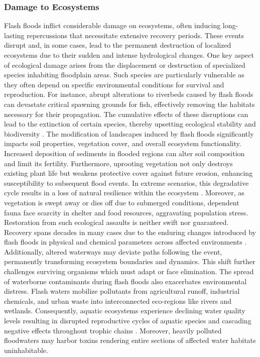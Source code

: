 \subsubsection{Damage to Ecosystems}
Flash floods inflict considerable damage on ecosystems, often inducing long-lasting repercussions that necessitate extensive recovery periods. These events disrupt and, in some cases, lead to the permanent destruction of localized ecosystems due to their sudden and intense hydrological changes. One key aspect of ecological damage arises from the displacement or destruction of specialized species inhabiting floodplain areas. Such species are particularly vulnerable as they often depend on specific environmental conditions for survival and reproduction. For instance, abrupt alterations to riverbeds caused by flash floods can devastate critical spawning grounds for fish, effectively removing the habitats necessary for their propagation. The cumulative effects of these disruptions can lead to the extinction of certain species, thereby upsetting ecological stability and biodiversity \citep{Buzgaru2021}.
The modification of landscapes induced by flash floods significantly impacts soil properties, vegetation cover, and overall ecosystem functionality. Increased deposition of sediments in flooded regions can alter soil composition and limit its fertility. Furthermore, uprooting vegetation not only destroys existing plant life but weakens protective cover against future erosion, enhancing susceptibility to subsequent flood events. In extreme scenarios, this degradative cycle results in a loss of natural resilience within the ecosystem \citep{Nguyen2020}.
Moreover, as vegetation is swept away or dies off due to submerged conditions, dependent fauna face scarcity in shelter and food resources, aggravating population stress. Restoration from such ecological assaults is neither swift nor guaranteed. Recovery spans decades in many cases due to the enduring changes introduced by flash floods in physical and chemical parameters across affected environments \citep{Buzgaru2021}. Additionally, altered waterways may deviate paths following the event, permanently transforming ecosystem boundaries and dynamics. This shift further challenges surviving organisms which must adapt or face elimination.
The spread of waterborne contaminants during flash floods also exacerbates environmental distress. Flash waters mobilize pollutants from agricultural runoff, industrial chemicals, and urban waste into interconnected eco-regions like rivers and wetlands. Consequently, aquatic ecosystems experience declining water quality levels resulting in disrupted reproductive cycles of aquatic species and cascading negative effects throughout trophic chains \citep{Nguyen2020}\citep{Terti2017}. Moreover, heavily polluted floodwaters may harbor toxins rendering entire sections of affected water habitats uninhabitable.
